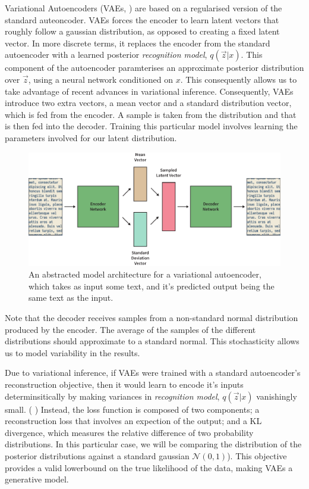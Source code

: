 \documentclass[12pt,twoside]{report}
\begin{document}
Variational Autoencoders (VAEs, \cite{kingma_auto-encoding_2013}) are based on a regularised version of the standard auteoncoder. VAEs forces the encoder to learn latent vectors that roughly follow a gaussian distribution, as opposed to creating a fixed latent vector. In more discrete terms, it replaces the encoder from the standard autoencoder with a learned posterior \textit{recognition model}, $q(\overrightarrow{z}|x)$. This component of the autoencoder paramterises an approximate posterior distribution over $\overrightarrow{z}$, using a neural network conditioned on $x$. This consequently allows us to take advantage of recent advances in variational inference.  Consequently, VAEs introduce two extra vectors, a mean vector and a standard distribution vector, which is fed from the encoder. A sample is taken from the distribution and that is then fed into the decoder. Training this particular model involves learning the parameters involved for our latent distribution.

\begin{figure}[!ht]
	\centering
	\includegraphics[width=150mm]{diagrams/variational_autoencoders.pdf}
	\caption{An abstracted model architecture for a variational autoencoder, which takes as input some text, and it's predicted output being the same text as the input.\label{vae}}
  \end{figure}

  Note that the decoder receives samples from a non-standard normal distribution produced by the encoder. The average of the samples of the different distributions should approximate to a standard normal. This stochasticity allows us to model variability in the results. 
  
  Due to variational inference, if VAEs were trained with a standard autoencoder's reconstruction objective, then it would learn to encode it's inputs determinsitically by making variances in \textit{recognition model}, $q(\overrightarrow{z}|x)$ vanishingly small. ( \cite{raiko_techniques_2014}) Instead, the loss function is composed of two components;  a reconstruction loss that involves an expection of the output; and a KL divergence, which measures the relative difference of two probability distributions. In this particular case, we will be comparing the distribution of the posterior distributions against a standard gaussian $ \mathcal{N}(0,1)$). This objective provides a valid lowerbound on the true likelihood of the data, making VAEs a generative model.
  
\end{document}

